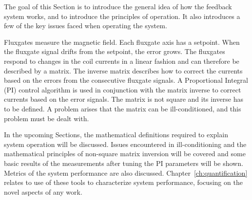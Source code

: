 
The goal of this Section is to introduce the general idea of how the feedback system works, and to introduce the principles of operation.  It also introduces a few of the key issues faced when operating the system. 

Fluxgates measure the magnetic field. Each fluxgate axis has a setpoint. When the fluxgate signal drifts from the setpoint, the error grows. The fluxgates respond to changes in the coil currents in a linear fashion and can therefore be described by a matrix. The inverse matrix describes how to correct the currents based on the errors from the consecutive fluxgate signals. A Proportional Integral (PI) control algorithm  is used in conjunction with the matrix inverse to correct currents based on the error signals. The matrix is not square and its inverse has to be defined. A problem arises that the matrix can be ill-conditioned, and this problem must be dealt with. 

In the upcoming Sections, the mathematical definitions required to explain system operation will be discussed. Issues encountered in ill-conditioning and the mathematical principles of non-square matrix inversion will be covered and some basic results of the measurements after tuning the PI parameters will be shown. Metrics of the system performance are also discussed. Chapter~\ref{ch:quantification} relates to use of these tools to characterize system performance, focusing on the novel aspects of any work.

